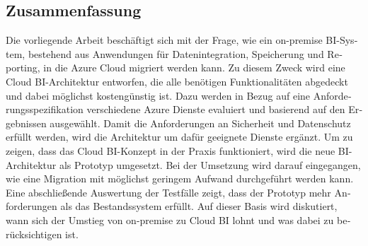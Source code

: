 \begin{otherlanguage}{ngerman}
	\chapter*{Zusammenfassung}
Die vorliegende Arbeit beschäftigt sich mit der Frage, wie ein on-premise BI-System, bestehend aus Anwendungen für Datenintegration, Speicherung und Reporting, in die Azure Cloud migriert werden kann. Zu diesem Zweck wird eine Cloud BI-Architektur entworfen, die alle benötigen Funktionalitäten abgedeckt und dabei möglichst kostengünstig ist. Dazu werden in Bezug auf eine Anforderungsspezifikation verschiedene Azure Dienste evaluiert und basierend auf den Ergebnissen ausgewählt. Damit die Anforderungen an Sicherheit und Datenschutz erfüllt werden, wird die Architektur um dafür geeignete Dienste ergänzt.
Um zu zeigen, dass das Cloud BI-Konzept in der Praxis funktioniert, wird die neue BI-Architektur als Prototyp umgesetzt. Bei der Umsetzung wird darauf eingegangen, wie eine Migration mit möglichst geringem Aufwand durchgeführt werden kann. Eine abschließende Auswertung der Testfälle zeigt, dass der Prototyp mehr Anforderungen als das Bestandssystem erfüllt. Auf dieser Basis wird diskutiert, wann sich der Umstieg von on-premise zu Cloud BI lohnt und was dabei zu berücksichtigen ist.
\end{otherlanguage}